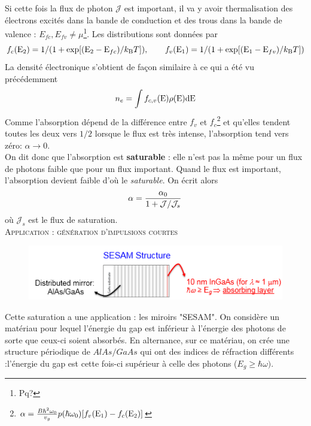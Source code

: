 	Si cette fois la flux de photon $\mathcal{J}$ est important, il va y avoir thermalisation des 
	électrons excités dans la bande de conduction et des trous dans la bande de valence : 
	$E_{fc}, E_{fv} \neq \mu$\footnote{Pq?}. Les distributions sont données par
	\begin{equation}
	{f_c}({{\rm{E}}_2}) = 1/(1 + \exp [({{\rm{E}}_2} - {{\rm{E}}_{fc}})/{k_{\rm{B}}}T]),\qquad
	{f_v}({{\rm{E}}_1}) = 1/(1 + \exp [({{\rm{E}}_1} - {{\rm{E}}_{fv}})/{k_{\rm{B}}}T])
	\end{equation}
	La densité électronique s'obtient de façon similaire à ce qui a été vu précédemment
	\begin{equation}
	{n_e} = \int {{f_{c,v}}({\rm{E}})\rho ({\rm{E}}){\rm{dE}}} 
	\end{equation}
	Comme l'absorption dépend de la différence entre $f_v$ et $f_c$\footnote{$\alpha  = 
	\frac{{B{\hbar ^2}{\omega _0}}}{{{v_g}}}p(\hbar {\omega _0})[{f_v}({{\rm{E}}_1}) -
	{f_c}({{\rm{E}}_2})]$} et qu'elles tendent toutes les deux vers $1/2$ lorsque le flux est très
	intense, l'absorption tend vers zéro: $\alpha\to0$.\\
	
	On dit donc que l'absorption est \textbf{saturable} : elle n'est pas la même pour un flux de 
	photons faible que pour un flux important. Quand le flux est important, l'absorption devient
	faible d'où le \textit{saturable}. On écrit alors
	\begin{equation}
	\alpha  = \frac{{{\alpha _0}}}{{1 + {\cal J}/{{\cal J}_s}}}
	\end{equation}
	où $\mathcal{J}_s$ est le flux de saturation.\\
	
	\textsc{Application : génération d'impulsions courtes}\\
	\begin{figure}
	\vspace{-5mm}
	\includegraphics[scale=0.6]{ch5/image26}
	\end{figure}
	Cette saturation a une application : les miroirs "SESAM". On considère un matériau pour lequel
	l'énergie du gap est inférieur à l'énergie des photons de sorte que ceux-ci soient absorbés. En 
	alternance, sur ce matériau, on crée une structure périodique de $AlAs/GaAs$ qui ont des 
	indices de réfraction différents :l'énergie du gap est cette fois-ci supérieur à celle des 
	photons ($E_g\geq\hbar\omega)$. \\
	
